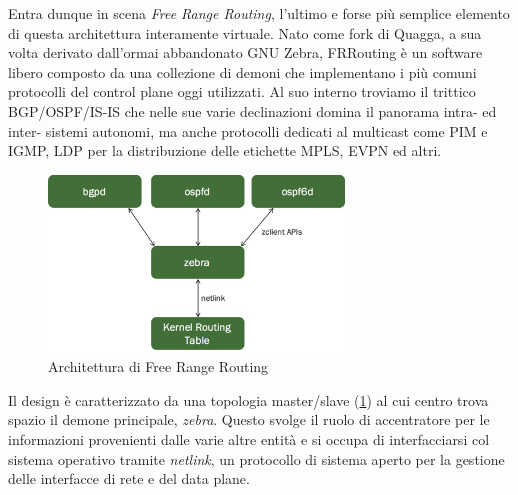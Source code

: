 Entra dunque in scena \textit{Free Range Routing}, l'ultimo e forse più semplice elemento di questa architettura interamente virtuale. Nato come fork di Quagga, a sua volta derivato dall'ormai abbandonato GNU Zebra, FRRouting è un software libero composto da una collezione di demoni che implementano i più comuni protocolli del control plane oggi utilizzati. Al suo interno troviamo il trittico BGP/OSPF/IS-IS che nelle sue varie declinazioni domina il panorama intra- ed inter- sistemi autonomi, ma anche protocolli dedicati al multicast come PIM e IGMP, LDP per la distribuzione delle etichette MPLS, EVPN ed altri.

\begin{figure}[htb]
    \includegraphics[width=0.7\textwidth]{graphics/frrouting-overview-daemons.png}
    \caption{Architettura di Free Range Routing}
    \label{fig:frr-arch}
\end{figure}

Il design è caratterizzato da una topologia master/slave (\cref{fig:frr-arch}) al cui centro trova spazio il demone principale, \textit{zebra}. Questo svolge il ruolo di accentratore per le informazioni provenienti dalle varie altre entità e si occupa di interfacciarsi col sistema operativo tramite \textit{netlink}, un protocollo di sistema aperto per la gestione delle interfacce di rete e del data plane.

